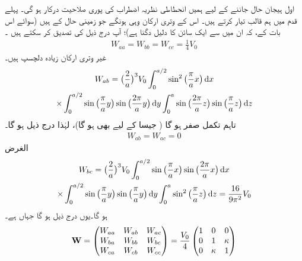  اول ہیجان  حال جاننے کے لیے ہمیں انحطاطی نظریہ اضطراب کی  پوری صلاحیت درکار ہو گی۔ پہلے قدم میں ہم قالب  تیار کرتے ہیں۔  اس کے  وتری ارکان وہی ہونگے جو زمینی حال کے ہیں  (سوائے اس بات کے،  کہ  ان میں سے ایک سائن  کا دلیل دگنا ہے)؛  آپ درج ذیل کی  تصدیق کر سکتے  ہیں ۔
\begin{align*}
W_{aa} = W_{bb} = W_{cc} = \frac{1}{4} V_0
\end{align*}
غیر وتری ارکان زیادہ دلچسپ ہیں۔ 
\begin{multline*}
W_{ab} = \big ( \frac{2}{a} \big )^3 V_0 \int_0^{a/2} \sin^2 \big ( \frac{\pi}{a} x \big ) \dif x\\
\times \int_0^{a/2} \sin \big (\frac{\pi}{a} y \big ) \sin \big ( \frac{2 \pi}{a} y \big ) \dif y \int_0^a \sin \big ( \frac{2 \pi}{a} z \big ) \sin \big ( \frac{\pi}{a} z \big ) \dif z
\end{multline*}
تاہم  تکمل صفر ہو گا ( جیسا  کے لیے بھی ہو گا)،  لہٰذا  درج ذیل ہو گا۔ 
\begin{align*}
W_{ab} = W_{ac} = 0
\end{align*}
الغرض 
\begin{multline*}
W_{bc} = \big ( \frac{2}{a} \big )^3 V_0 \int_0^{a/2} \sin \big ( \frac{\pi}{a} x \big ) \sin \big (\frac{2 \pi}{a} x \big ) \dif x\\
\times \int_0^{a/2} \sin \big (\frac{\pi}{a} y \big ) \sin \big ( \frac{\pi}{a} y \big ) \dif y \int_0^a \sin^2 \big ( \frac{\pi}{a} z \big ) \dif z = \frac{16}{9 \pi^2} V_0
\end{multline*}
ہو گا۔یوں درج ذیل ہو گا جہاں  ہے۔
\begin{align}
\operatorname{\mathbf{W}} =
\begin{pmatrix}
W_{aa} & W_{ab} & W_{ac} \\
W_{ba} & W_{bb} & W_{bc} \\
W_{ca} & W_{cb} & W_{cc}
\end{pmatrix}=
 \frac{V_0}{4}
\begin{pmatrix}
1 & 0 & 0 \\
0 & 1 & \kappa \\
0 & \kappa & 1
\end{pmatrix}
\end{align}

